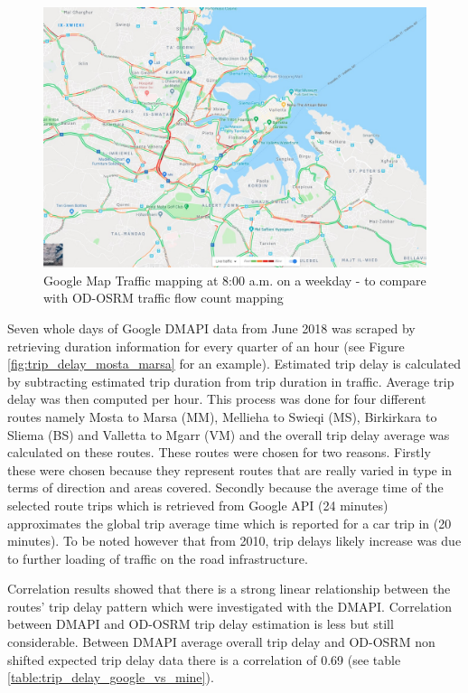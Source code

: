 \documentclass[12pt, a4paper]{report}
\theoremstyle{definition}
\theoremstyle{definition}%
\theoremstyle{definition}%
\theoremstyle{definition}%
\theoremstyle{definition}%
\theoremstyle{definition}%
\begin{document}
\begin{figure}[!]	
	\includegraphics[scale=0.4]{google_traffic_900am.jpg}
	\centering
	\caption[Google Map Traffic delay mapping]{Google Map Traffic mapping at 8:00 a.m. on a weekday - to compare with OD-OSRM traffic flow count mapping}
	\label{fig:trip_delay_google_900am}
\end{figure}
 

Seven whole days of Google DMAPI data from June 2018 was scraped by retrieving duration information for every quarter of an hour (see Figure \ref{fig:trip_delay_mosta_marsa} for an example). Estimated trip delay is calculated by subtracting estimated trip duration from trip duration in traffic. Average trip delay was then computed per hour. This process was done for four different routes namely Mosta to Marsa (MM), Mellieha to Swieqi (MS), Birkirkara to Sliema (BS) and Valletta to Mgarr (VM) and the overall trip delay average was calculated on these routes. These routes were chosen for two reasons. Firstly these were chosen because they represent routes that are really varied in type in terms of direction and areas covered. Secondly because the average time of the selected route trips which is retrieved from Google API (24 minutes) approximates the global trip average time which is reported for a car trip in \cite{malta2011national} (20 minutes). To be noted however that from 2010, trip delays likely increase was due to further loading of traffic on the road infrastructure.

Correlation results showed that there is a strong linear relationship between the routes' trip delay pattern which were investigated with the DMAPI. Correlation between DMAPI and OD-OSRM trip delay estimation is less but still considerable. Between DMAPI average overall trip delay and OD-OSRM non shifted expected trip delay data there is a correlation of 0.69 (see table \ref{table:trip_delay_google_vs_mine}).
\end{document}
